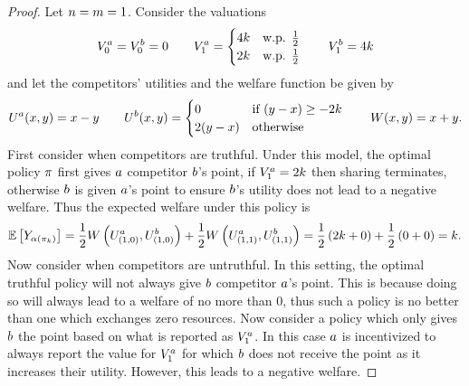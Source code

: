 \begin{proof}
    Let $n=m=1$.
    Consider the valuations
    \begin{align*}
        V^a_{0}=V^b_{0}=0
        \qquad
        V^a_{1}
        =
        \begin{cases}
            4k
            &
            \text{w.p. } \frac{1}{2}
            \\
            2k
            &
            \text{w.p. } \frac{1}{2}
        \end{cases}  
        \qquad
        V^b_{1} = 4k
    \end{align*}  
    and let the competitors' utilities and the welfare function be given by
    \begin{align*}
        U^a(x,y) 
        =
        x-y
        \qquad
        U^b(x,y)
        =
        \begin{cases}
            0 
            &
            \text{if }
            (y-x)\geq -2k
            \\
            2(y-x)
            &
            \text{otherwise}
        \end{cases}  
        \qquad
        W(x,y)=x+y .
    \end{align*}
    First consider when competitors are truthful. 
    Under this model, the optimal policy 
    \(
        \pi
    \)
    first gives $a$ competitor $b$'s point,
    if 
    $V^a_{1}=2k$ 
    then sharing terminates, otherwise $b$ is given
    $a$'s point to ensure $b$'s utility does not lead to a negative welfare.
    Thus the expected welfare under this policy is 
    \[
        \mathbb{E}\left[
            Y_{
                \alpha\left(
                    \pi_k
                \right)
            }
        \right]
        =
        \frac{1}{2}
        W\left(
            U^a_{
                (1,0)
            },
            U^b_{
                (1,0)
            }
        \right)
        +
        \frac{1}{2}
        W\left(
            U^a_{
                (1,1)
            },
            U^b_{
                (1,1)
            }
        \right)
        =
        \frac{1}{2}
        \left(
            2k
            + 0 
        \right)
        +
        \frac{1}{2}
        \left(
            0 + 0
        \right) 
        =
        k.
    \] 
    Now consider when competitors are untruthful. 
    In this setting, the optimal truthful policy will
    not always 
    give $b$ competitor
    $a$'s point. This is because doing so will always lead to a welfare of no more than 0,
    thus such a policy is no better than one which exchanges zero resources.
    Now consider a policy which only gives $b$ the point based on what is reported as $V^a_{1}$.
    In this case $a$ is incentivized to always report the value for $V^a_{1}$ for which $b$
    does not receive the point as it increases their utility. However, this leads to a negative welfare.


\end{proof}
